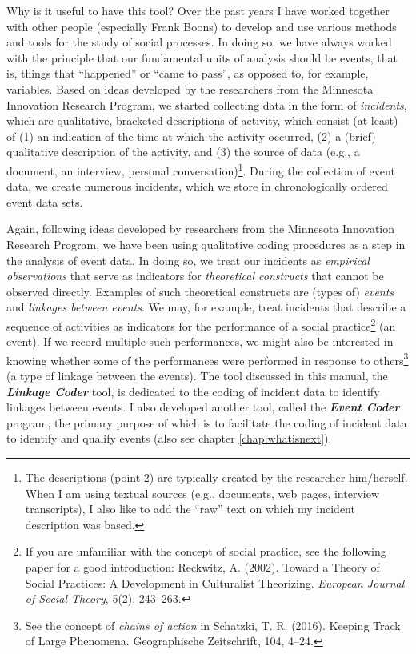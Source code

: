 \documentclass{memoir}
\begin{document}
Why is it useful to have this tool? Over the past years I have worked together with other people (especially Frank Boons) to develop and use various methods and tools for the study of social processes. In doing so, we have always worked with the principle that our fundamental units of analysis should be events, that is, things that ``happened'' or ``came to pass'', as opposed to, for example, variables. Based on ideas developed by the researchers from the Minnesota Innovation Research Program, we started collecting data in the form of \emph{incidents}, which are qualitative, bracketed descriptions of activity, which consist (at least) of (1) an indication of the time at which the activity occurred, (2) a (brief) qualitative description of the activity, and (3) the source of data (e.g., a document, an interview, personal conversation)\footnote{The descriptions (point 2) are typically created by the researcher him/herself. When I am using textual sources (e.g., documents, web pages, interview transcripts), I also like to add the ``raw'' text on which my incident description was based.}. During the collection of event data, we create numerous incidents, which we store in chronologically ordered event data sets.

Again, following ideas developed by researchers from the Minnesota Innovation Research Program, we have been using qualitative coding procedures as a step in the analysis of event data. In doing so, we treat our incidents as \emph{empirical observations} that serve as indicators for \emph{theoretical constructs} that cannot be observed directly. Examples of such theoretical constructs are (types of) \emph{events} and \emph{linkages between events}. We may, for example, treat incidents that describe a sequence of activities as indicators for the performance of a social practice\footnote{If you are unfamiliar with the concept of social practice, see the following paper for a good introduction: Reckwitz, A. (2002). Toward a Theory of Social Practices: A Development in Culturalist Theorizing. \emph{European Journal of Social Theory}, 5(2), 243–263.} (an event). If we record multiple such performances, we might also be interested in knowing whether some of the performances were performed in response to others\footnote{See the concept of \emph{chains of action} in Schatzki, T. R. (2016). Keeping Track of Large Phenomena. Geographische Zeitschrift, 104, 4–24.} (a type of linkage between the events). The tool discussed in this manual, the \emph{\textbf{Linkage Coder}} tool, is dedicated to the coding of incident data to identify linkages between events. I also developed another tool, called the \emph{\textbf{Event Coder}} program, the primary purpose of which is to facilitate the coding of incident data to identify and qualify events (also see chapter \ref{chap:whatisnext}). 
\end{document}
